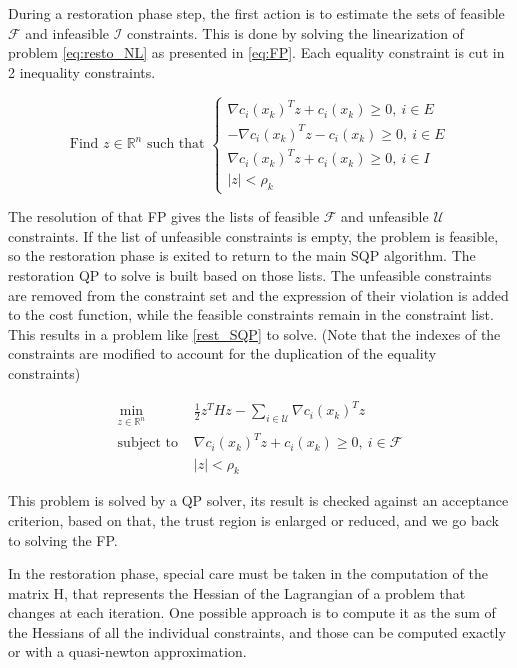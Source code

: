 During a restoration phase step, the first action is to estimate the sets of feasible $\mathcal{F}$ and infeasible $\mathcal{I}$ constraints.
This is done by solving the linearization of problem \ref{eq:resto_NL} as presented in \ref{eq:FP}.
Each equality constraint is cut in 2 inequality constraints.

\begin{equation}
  \text{Find $z\in\mathbb{R}^n$ such that }
  \left\{
  \begin{array}{l}
    \nabla c_i(x_k)^Tz+c_i(x_k)\geq 0,\ i\in E \\
    -\nabla c_i(x_k)^Tz-c_i(x_k)\geq 0,\ i\in E \\
    \nabla c_i(x_k)^Tz+c_i(x_k)\geq 0,\ i\in I\\
    |z|<\rho_k
  \end{array}
  \right.
  \label{eq:FP}
\end{equation}

The resolution of that FP gives the lists of feasible $\mathcal{F}$ and unfeasible $\mathcal{U}$ constraints.
If the list of unfeasible constraints is empty, the problem is feasible, so the restoration phase is exited to return to the main SQP algorithm.
The restoration QP to solve is built based on those lists.
The unfeasible constraints are removed from the constraint set and the expression of their violation is added to the cost function, while the feasible constraints remain in the constraint list.
This results in a problem like \ref{rest_SQP} to solve.
(Note that the indexes of the constraints are modified to account for the duplication of the equality constraints)

\begin{equation}
  \begin{array}{ll}
    \min\limits_{z\in \mathbb{R}^n}{} & \frac{1}{2}z^THz - \sum\limits_{i\in\mathcal{U}}\nabla c_i(x_k)^Tz \\
    \text{subject to } & \nabla c_i(x_k)^Tz+c_i(x_k)\geq 0,\ i \in \mathcal{F} \\
                       & |z|<\rho_k
  \end{array}
  \label{rest_SQP}
\end{equation}

This problem is solved by a QP solver, its result is checked against an acceptance criterion, based on that, the trust region is enlarged or reduced, and we go back to solving the FP.

In the restoration phase, special care must be taken in the computation of the matrix H, that represents the Hessian of the Lagrangian of a problem that changes at each iteration.
One possible approach is to compute it as the sum of the Hessians of all the individual constraints, and those can be computed exactly or with a quasi-newton approximation.

